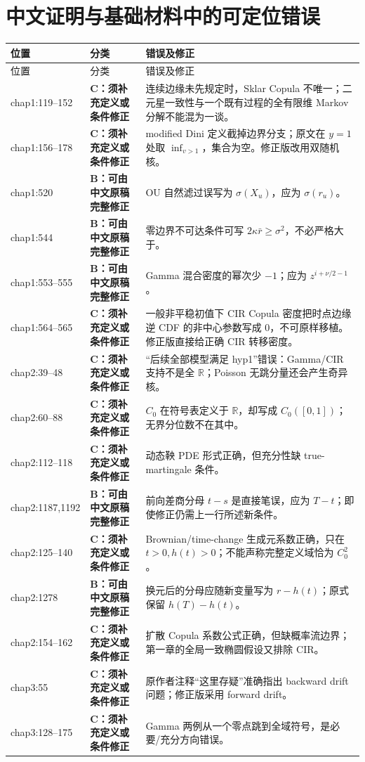 \documentclass[UTF8,11pt]{ctexart}
\newcommand{\R}{\mathbb R}
\newcommand{\Bcat}{\textcolor{blue!65!black}{\textbf{B：可由中文原稿完整修正}}}
\newcommand{\Ccat}{\textcolor{orange!80!black}{\textbf{C：须补充定义或条件修正}}}
\begin{document}
\section{中文证明与基础材料中的可定位错误}

\begin{longtable}{p{}p{}p{}}
\toprule
位置 & 分类 & 错误及修正\\
\midrule
\endfirsthead
\toprule
位置 & 分类 & 错误及修正\\
\midrule
\endhead
chap1:119--152 & \Ccat & 连续边缘未先规定时，Sklar Copula 不唯一；二元星一致性与一个既有过程的全有限维 Markov 分解不能混为一谈。\\
chap1:156--178 & \Ccat & modified Dini 定义截掉边界分支；原文在 $y=1$ 处取 $\inf_{v>1}$，集合为空。修正版改用双随机核。\\
chap1:520 & \Bcat & OU 自然滤过误写为 $\sigma(X_u)$，应为 $\sigma(r_u)$。\\
chap1:544 & \Bcat & 零边界不可达条件可写 $2\kappa\bar r\ge\sigma^2$，不必严格大于。\\
chap1:553--555 & \Bcat & Gamma 混合密度的幂次少 $-1$；应为 $z^{i+\nu/2-1}$。\\
chap1:564--565 & \Ccat & 一般非平稳初值下 CIR Copula 密度把时点边缘逆 CDF 的非中心参数写成 0，不可原样移植。修正版直接给正确 CIR 转移密度。\\
chap2:39--48 & \Ccat & “后续全部模型满足 hyp1”错误：Gamma/CIR 支持不是全 $\R$；Poisson 无跳分量还会产生奇异核。\\
chap2:60--88 & \Ccat & $C_0$ 在符号表定义于 $\R$，却写成 $C_0([0,1])$；无界分位数不在其中。\\
chap2:112--118 & \Ccat & 动态鞅 PDE 形式正确，但充分性缺 true-martingale 条件。\\
chap2:1187,1192 & \Bcat & 前向差商分母 $t-s$ 是直接笔误，应为 $T-t$；即使修正仍需上一行所述新条件。\\
chap2:125--140 & \Ccat & Brownian/time-change 生成元系数正确，只在 $t>0,h(t)>0$；不能声称完整定义域恰为 $C_0^2$。\\
chap2:1278 & \Bcat & 换元后的分母应随新变量写为 $r-h(t)$；原式保留 $h(T)-h(t)$。\\
chap2:154--162 & \Ccat & 扩散 Copula 系数公式正确，但缺概率流边界；第一章的全局一致椭圆假设又排除 CIR。\\
chap3:55 & \Ccat & 原作者注释“这里存疑”准确指出 backward drift 问题；修正版采用 forward drift。\\
chap3:128--175 & \Ccat & Gamma 两例从一个零点跳到全域符号，是必要/充分方向错误。\\

\end{longtable}
\end{document}

